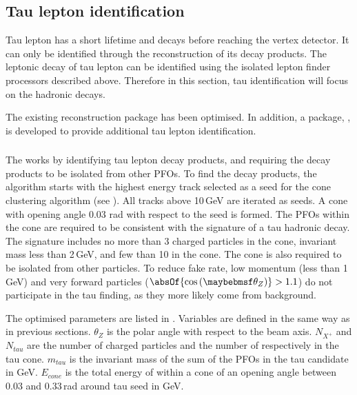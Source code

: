 \subsection{Tau lepton identification}

Tau lepton has a short lifetime and decays before reaching the vertex detector. It can only be identified through the reconstruction of its decay products. The leptonic decay of tau lepton can be identified using the isolated lepton finder processors described above. Therefore in this section, tau identification will focus on the hadronic decays.

The existing \TauFinderProcessor  \cite{LCD-Note-2010-009} reconstruction package has been optimised. In addition, a package, \BonoTauFinder, is developed to provide additional tau lepton identification.




\subsubsection{\TauFinderProcessor}

The \TauFinderProcessor works by identifying tau lepton decay products, and requiring the decay products to be isolated from other PFOs. To find the decay products, the algorithm starts with the highest energy track selected as a seed for the cone clustering algorithm  (see  ). All tracks above 10\,GeV are iterated as seeds. A cone with opening angle 0.03 rad with respect to the seed is formed. The PFOs within the cone are required to be consistent with the signature of a tau hadronic decay. The signature includes no more than 3 charged particles in the cone, invariant mass less than 2\,GeV, and few than 10 \PFOs in the cone. The cone is also required to be isolated from other particles. To reduce fake rate, low momentum (less than 1\,GeV) and very forward particles ($\absOf{\cos\left(\theta_Z\right)} > 1.1$) do not participate in the tau finding, as they more likely come from \ggHad background.


The optimised parameters are listed in . Variables are defined in the same way as in previous sections. $\theta_Z$ is the polar angle with respect to the beam axis. $N_{X^+}$ and $N_{tau}$ are the number of charged particles and the number of \PFOs respectively in the tau cone. $m_{tau}$ is the invariant mass of the sum of the PFOs in the tau candidate in GeV. $E_{cone}$ is the total energy of \PFOs within a cone of an opening angle between 0.03 and 0.33\,rad  around tau seed in GeV.

